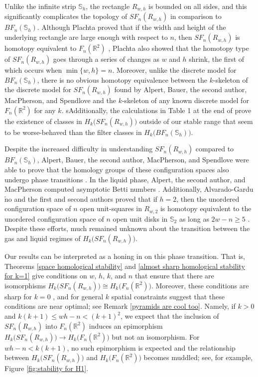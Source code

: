 \documentclass[pagebackref,colorlinks,citecolor=blue,linkcolor=blue,urlcolor=blue,filecolor=blue]{article}
\theoremstyle{definition}\newtheorem{definition}[thm]{Definition}
\theoremstyle{definition}
\newcommand{\R}{\ensuremath{\mathbb{R}}}
\begin{document}
Unlike the infinite strip $\mathbb{S}_{h}$, the rectangle $R_{w,h}$ is bounded on all sides, and this significantly complicates the topology of $SF_{n}(R_{w,h})$ in comparison to $BF_{n}(\mathbb{S}_{h})$.
Although Plachta proved that if the width and height of the underlying rectangle are large enough with respect to $n$, then $SF_{n}(R_{w,h})$ is homotopy equivalent to $F_{n}(\R^{2})$ \cite{plachta2021configuration}, Plachta also showed that the homotopy type of $SF_{n}(R_{w,h})$ goes through a series of changes as $w$ and $h$ shrink, the first of which occurs when $\min\{w,h\}=n$.
Moreover, unlike the discrete model for $BF_{n}(\mathbb{S}_{h})$, there is no obvious homotopy equivalence between the $k$-skeleton of the discrete model for $SF_{n}(R_{w,h})$ found by Alpert, Bauer, the second author, MacPherson, and Spendlove \cite{alpert2023homology} and the $k$-skeleton of any known discrete model for $F_{n}(\R^{2})$ for any $k$.
sAdditionally, the calculations in Table 1 at the end of \cite{alpert2023homology} prove the existence of classes in $H_{k}\big(SF_{n}(R_{w,h})\big)$ outside of our stable range that seem to be worse-behaved than the filter classes in $H_{k}\big(BF_{n}(\mathbb{S}_{h})\big)$.

Despite the increased difficulty in understanding $SF_{n}(R_{w,h})$ compared to $BF_{n}(\mathbb{S}_{h})$, Alpert, Bauer, the second author, MacPherson, and Spendlove were able to prove that the homology groups of these configuration spaces also undergo phase transitions \cite{alpert2023homology}.
In the liquid phase, Alpert, the second author, and MacPherson computed asymptotic Betti numbers \cite{alpert2023asymptotic}.
Additionally, Alvarado-Gardu$\tilde{\text{n}}$o and the first and second authors proved that if $h=2$, then the unordered configuration space of $n$ open unit-squares in $R_{w,2}$ is homotopy equivalent to the unordered configuration space of $n$ open unit disks in $\mathbb{S}_{2}$ as long as $2w-n\ge 5$ \cite{MattOmarJesus}.
Despite these efforts, much remained unknown about the transition between the gas and liquid regimes of $H_{k}\big(SF_{n}(R_{w,h})\big)$.

Our results can be interpreted as a honing in on this phase transition.
That is, Theorems \ref{space homological stability} and \ref{almost sharp homological stability for k=1} give conditions on $w$, $h$, $k$, and $n$ that ensure that there are isomorphisms $H_{k}\big(SF_{n}(R_{w,h})\big)\cong H_{k}\big(F_{n}(\R^{2})\big)$.
Moreover, these conditions are sharp for $k=0$ \cite{johnson1879notes}, and for general $k$ spatial constraints suggest that these conditions are near optimal; see Remark \ref{pyramids are cool too}.
Namely, if $k>0$ and $k(k+1)\le wh-n<(k+1)^{2}$, we expect that the inclusion of $SF_{n}(R_{w,h})$ into $F_{n}(\R^{2})$ induces an epimorphism $H_{k}\big(SF_{n}(R_{w,h})\big)\to H_{k}\big(F_{n}(\R^{2})\big)$ but not an isomorphism.
For $wh-n<k(k+1)$, no such epimorphism is expected and the relationship between $H_{k}\big(SF_{n}(R_{w,h})\big)$ and $H_{k}\big(F_{n}(\R^{2})\big)$ becomes muddled; see, for example, Figure \ref{fig:stability for H1}.
\end{document}
